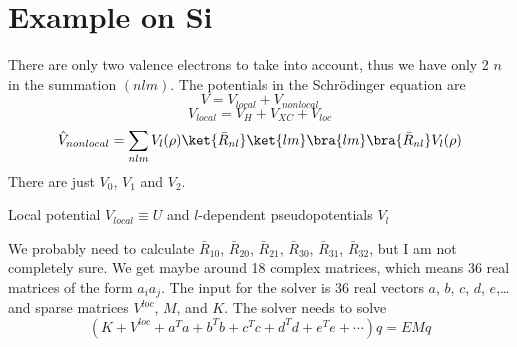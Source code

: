 \section{Example on Si}

There are only two valence electrons to take into account, thus we have only 2
$n$ in the summation $(nlm)$. The potentials in the Schr\"odinger equation are
$$V=V_{local}+V_{nonlocal}$$
$$V_{local}=V_H+V_{XC}+V_{loc}$$
$$\hat V_{nonlocal}=
\sum_{nlm}V_l(\rho)\ket{\bar R_{nl}}\ket{lm}
\bra{lm}\bra{\bar R_{nl}}V_l(\rho)$$
There are just $V_0$, $V_1$ and $V_2$.

{Local potential $V_{local}\equiv U$ and $l$-dependent pseudopotentials $V_l$}

We probably need to calculate
$\bar R_{10}$,
$\bar R_{20}$,
$\bar R_{21}$,
$\bar R_{30}$,
$\bar R_{31}$,
$\bar R_{32}$,
but I am not completely sure. We get maybe around 
18 complex matrices, which means 36 real matrices of the form
$a_ia_j$. The input for the solver is 36 real vectors $a$, $b$, $c$, $d$,
$e$,\dots and sparse matrices $V^{loc}$, $M$, and $K$. The solver needs to
solve
$$(K+V^{loc}+a^Ta+b^Tb+c^Tc+d^Td+e^Te+\cdots)q=EMq$$
